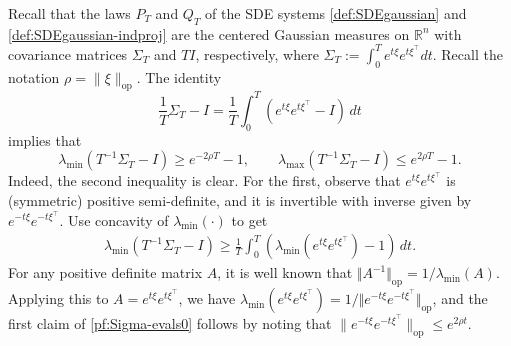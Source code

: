 \documentclass[11pt,reqno]{amsart}
\numberwithin{equation}{section}
\theoremstyle{definition}
\def\R{{\mathbb R}}
\begin{document}
Recall that the laws $P_T$ and $Q_T$ of the SDE systems \eqref{def:SDEgaussian} and \eqref{def:SDEgaussian-indproj} are the centered Gaussian measures on $\R^n$ with covariance matrices $\Sigma_T$ and $TI$, respectively, where $\Sigma_T := \int_0^T e^{t \xi}e^{t \xi^\top} dt$. 
Recall the notation $\rho=\|\xi\|_{\mathrm{op}}$.
The identity 
\begin{equation}
\frac{1}{T}\Sigma_T  - I = \frac{1}{T}\int_0^T(e^{t \xi}e^{t \xi^\top}- I) \,dt \label{pf:Gaussian-Sigma-I}
\end{equation}
implies that
\begin{equation}
\lambda_{\mathrm{min}}(T^{-1}\Sigma_T-I) \ge e^{-2\rho T} - 1 , \qquad \lambda_{\mathrm{max}}(T^{-1}\Sigma_T-I) \le  e^{2\rho T}-1 . \label{pf:Sigma-evals0}
\end{equation}
Indeed, the second inequality is clear. For the first, observe that $e^{t \xi}e^{t \xi^\top}$ is (symmetric) positive semi-definite, and it is invertible with inverse given by $e^{-t \xi}e^{-t \xi^\top}$. Use concavity of $\lambda_{\mathrm{min}}(\cdot)$ to get
\begin{align*}
\lambda_{\mathrm{min}}(T^{-1}\Sigma_T-I) \ge \frac{1}{T}\int_0^T(\lambda_{\mathrm{min}}(e^{t \xi}e^{t \xi^\top})- 1) \,dt.
\end{align*}
For any  positive definite matrix $A$, it is well known that $\Vert A^{-1} \Vert_{\mathrm{op}}=1/\lambda_{\min}(A)$. 	
Applying this to $A=e^{t \xi}e^{t \xi^\top}$, we have $\lambda_{\min}(e^{t \xi}e^{t \xi^\top})=1/\Vert e^{-t \xi}e^{-t \xi^\top}\Vert_{\mathrm{op}}$, and the first claim of \eqref{pf:Sigma-evals0} follows by noting that $\| e^{-t \xi}e^{-t \xi^\top}\|_{\mathrm{op}} \le e^{2\rho t}$.
\end{document}
